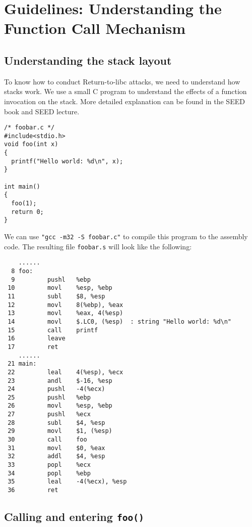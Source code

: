 \section{Guidelines: Understanding the Function Call Mechanism}


\subsection{Understanding the stack layout}

To know how to conduct Return-to-libc attacks, we need to 
understand how stacks work.  We use a small C program to understand 
the effects of a function invocation on the stack. More detailed 
explanation can be found in the SEED book and SEED lecture. 


\begin{lstlisting}
/* foobar.c */
#include<stdio.h>
void foo(int x)
{
  printf("Hello world: %d\n", x);
}

int main()
{
  foo(1);
  return 0;
}
\end{lstlisting}

We can use {\tt "gcc -m32 -S foobar.c"} to
compile this program to the assembly code.
The resulting file {\tt foobar.s} will look like the following:


\begin{lstlisting}
    ......
  8 foo:
  9         pushl   %ebp
 10         movl    %esp, %ebp
 11         subl    $8, %esp
 12         movl    8(%ebp), %eax   
 13         movl    %eax, 4(%esp)
 14         movl    $.LC0, (%esp)  : string "Hello world: %d\n"
 15         call    printf
 16         leave
 17         ret
    ......
 21 main:
 22         leal    4(%esp), %ecx
 23         andl    $-16, %esp
 24         pushl   -4(%ecx)
 25         pushl   %ebp
 26         movl    %esp, %ebp
 27         pushl   %ecx
 28         subl    $4, %esp
 29         movl    $1, (%esp)
 30         call    foo
 31         movl    $0, %eax
 32         addl    $4, %esp
 33         popl    %ecx
 34         popl    %ebp
 35         leal    -4(%ecx), %esp
 36         ret
\end{lstlisting}
 


\subsection{Calling and entering {\tt foo()}}

